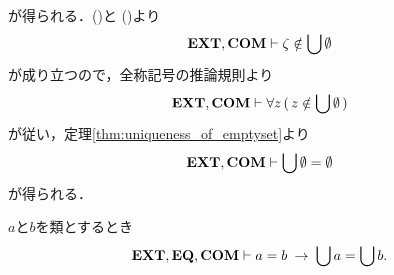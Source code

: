 \begin{sketch}
\begin{align}
			\label{fom:the_union_of_the_emptyset_is_empty_2}
		\end{align}
		が得られる．()と
		()より
		\begin{align}
			\mbox{{\bf EXT}},\mbox{\bf COM} \vdash \zeta \notin \bigcup \emptyset
		\end{align}
		が成り立つので，全称記号の推論規則より
		\begin{align}
			\mbox{{\bf EXT}},\mbox{\bf COM} \vdash \forall z\, (\, z \notin \bigcup \emptyset\, )
		\end{align}
		が従い，定理\ref{thm:uniqueness_of_emptyset}より
		\begin{align}
			\mbox{{\bf EXT}},\mbox{\bf COM} \vdash \bigcup \emptyset = \emptyset
		\end{align}
		が得られる．
		\QED
	\end{sketch}
	
	\begin{screen}
		\begin{thm}[等しい類の合併は等しい]\label{thm:unions_of_equal_classes_are_equal}
			$a$と$b$を類とするとき
			\begin{align}
				\mbox{{\bf EXT}},\mbox{{\bf EQ}},\mbox{\bf COM} \vdash a = b \hspace{0.25em}\rightarrow\hspace{0.25em} \bigcup a = \bigcup b.
			\end{align}
		\end{thm}
	\end{screen}
	
